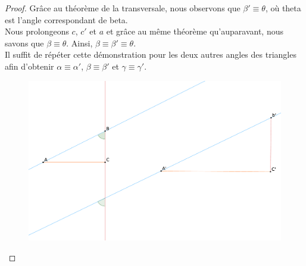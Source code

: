 \documentclass[a4paper,12pt]{article}
\begin{document}
\begin{proof}
Grâce au théorème de la transversale, nous observons que $\beta' \equiv \theta$, où theta est l'angle correspondant de beta.\\
Nous prolongeons $c$, $c'$ et $a$ et grâce au même théorème qu'auparavant, nous savons que $\beta \equiv \theta$.
Ainsi, $\beta \equiv \beta' \equiv \theta$.\\
Il suffit de répéter cette démonstration pour les deux autres angles des triangles afin d'obtenir $\alpha \equiv \alpha'$, $\beta \equiv \beta'$ et $\gamma \equiv \gamma'$.

\begin{figure}[H]
        \centering
        \includegraphics[scale=0.17]{semblable1-3.eps}
    \end{figure}

\end{proof}
\end{document}
